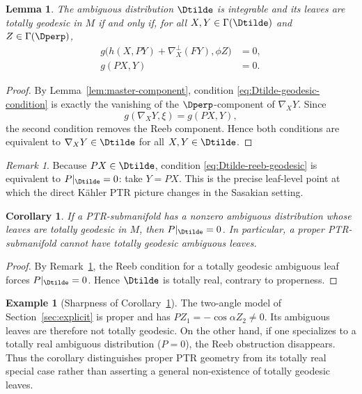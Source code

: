 \documentclass[11pt]{article}
\newtheorem{lemma}[theorem]{Lemma}\newtheorem{corollary}[theorem]{Corollary}
\theoremstyle{definition}\newtheorem{definition}[theorem]{Definition}\newtheorem{example}[theorem]{Example}
\theoremstyle{remark}\newtheorem{remark}[theorem]{Remark}
\begin{document}
\begin{lemma}\label{lem:Dtilde-geodesic}
The ambiguous distribution \(\Dtilde\) is integrable and its leaves are
totally geodesic in \(M\) if and only if, for all
\(X,Y\in\Gamma(\Dtilde)\) and \(Z\in\Gamma(\Dperp)\),
\begin{align}
g\bigl(h(X,PY)+\nabla_X^\perp(FY),\phi Z\bigr)&=0,
\label{eq:Dtilde-geodesic-condition}\\
g(PX,Y)&=0.
\label{eq:Dtilde-reeb-geodesic}
\end{align}
\end{lemma}

\begin{proof}
By Lemma~\ref{lem:master-component}, condition 
\eqref{eq:Dtilde-geodesic-condition} is exactly the
vanishing of the \(\Dperp\)-component of \(\nabla_XY\).  Since
\[
g(\nabla_XY,\xi)=g(PX,Y),
\]
the second condition removes the Reeb component.  Hence both conditions
are equivalent to \(\nabla_XY\in\Dtilde\) for all
\(X,Y\in\Dtilde\).
\end{proof}

\begin{remark}\label{rem:Dtilde-Reeb-collapse}
Because \(PX\in\Dtilde\), condition
\eqref{eq:Dtilde-reeb-geodesic} is equivalent to
\(P|_{\Dtilde}=0\): take \(Y=PX\).  This is the precise leaf-level point
at which the direct K\"ahler PTR picture changes in the Sasakian setting.
\end{remark}



\begin{corollary}\label{cor:proper-no-geodesic}
If a PTR-submanifold has a nonzero ambiguous distribution whose leaves are totally geodesic in $M$, then $P|_{\Dtilde}=0$.  In particular, a proper PTR-submanifold cannot have totally geodesic ambiguous leaves.
\end{corollary}
\begin{proof}
By Remark~\ref{rem:Dtilde-Reeb-collapse}, the Reeb condition for a
totally geodesic ambiguous leaf forces \(P|_{\Dtilde}=0\).  Hence
\(\Dtilde\) is totally real, contrary to properness.
\end{proof}

\begin{example}[Sharpness of Corollary~\ref{cor:proper-no-geodesic}]\label{ex:proper-no-geodesic}
The two-angle model of Section~\ref{sec:explicit} is proper and has $PZ_1=-\cos\alpha Z_2\neq0$.  Its ambiguous leaves are therefore not totally geodesic.  On the other hand, if one specializes to a totally real ambiguous distribution ($P=0$), the Reeb obstruction disappears.  Thus the corollary distinguishes proper PTR geometry from its totally real special case rather than asserting a general non-existence of totally geodesic leaves.
\end{example}
\end{document}
